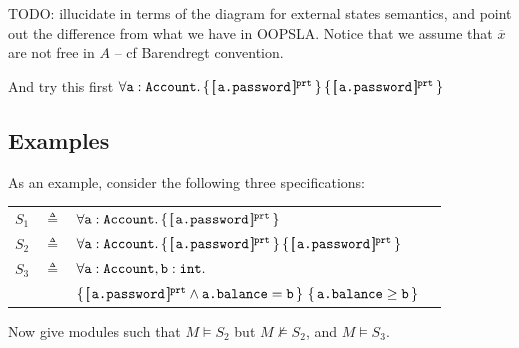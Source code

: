 TODO: illucidate in terms of the diagram for external states semantics, and point out the difference from what we have in OOPSLA.
Notice that we assume that $\overline x$ are not free in $A$ -- cf Barendregt convention.
%
%
%



And try this first $\TwoStatesQ {\prg{a}:\prg{Account}}  {\inside{\prg{a.password}}} {\inside{\prg{a.password}}}$

\subsection{Examples}
\noindent
As an example, consider the following three  specifications:

\begin{tabular}{lcll}
$S_1$   &     $\triangleq$   & $\forall {{\texttt{a}}:{\texttt{Account}} }.\, {\{}\, [\!\![ \,{\texttt{a.password}}\, ]\!\!]^{{\texttt{prt}}} \,{\}}  $
 \\
 $S_2$   & $\triangleq$   &  $\TwoStatesQ {\prg{a}:\prg{Account}}  {\inside{\prg{a.password}}} {\inside{\prg{a.password}}}$
 \\
$S_3$ & $\triangleq$   &
  $\forall {\texttt{a}}:{\texttt{Account}},{\texttt{b}}:{\texttt{int}}.$\\
  &  &  ${\{}\, [\!\![ \,{\texttt{a.password}}\, ]\!\!]^{{\texttt{prt}}} \wedge {\texttt{a.balance}}={\texttt{b}} \,{\}}  
\  {\{}\,  {\texttt{a.balance}}\geq {\texttt{b}}  \,{\}}$
\end{tabular}

Now give modules such that $M \models S_2$ but $M \not\models S_2$, and $M \models S_3$.


